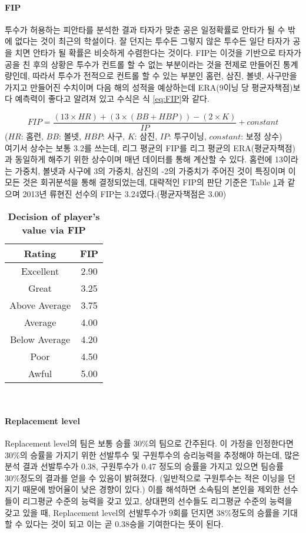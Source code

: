 \documentclass[11pt]{article}
\begin{document}
\paragraph{FIP}
투수가 허용하는 피안타를 분석한 결과 타자가 맞춘 공은 일정확률로 안타가 될 수 밖에 없다는 것이 최근의 학설이다. 잘 던지는 투수든 그렇지 않은 투수든 일단 타자가 공을 치면 안타가 될 확률은 비슷하게 수렴한다는 것이다. FIP는 이것을 기반으로 타자가 공을 친 후의 상황은 투수가 컨트롤 할 수 없는 부분이라는 것을 전제로 만들어진 통계량인데, 따라서 투수가 전적으로 컨트롤 할 수 있는 부분인 홈런, 삼진, 볼넷, 사구만을 가지고 만들어진 수치이며 다음 해의 성적을 예상하는데 ERA(9이닝 당 평균자책점)보다 예측력이 좋다고 알려져 있고 수식은 식 \ref{eq:FIP}와 같다\cite{FIP}.

\begin{equation}
\label{eq:FIP}
FIP=\frac{(13 \times HR)+(3 \times (BB+HBP))-(2 \times K)}{IP} + constant
\end{equation}
($HR$: 홈런, $BB$: 볼넷, $HBP$: 사구, $K$: 삼진, $IP$: 투구이닝, $constant$: 보정 상수)\\

여기서 상수는 보통 3.2를 쓰는데, 리그 평균의 FIP를 리그 평균의 ERA(평균자책점)과 동일하게 해주기 위한 상수이며 매년 데이터를 통해 계산할 수 있다. 홈런에 13이라는 가중치, 볼넷과 사구에 3의 가중치, 삼진의 -2의 가중치가 주어진 것이 특징이며 이 모든 것은 회귀분석을 통해 결정되었는데, 대략적인 FIP의 판단 기준은 Table \ref{FIPtable}과 같으며 2013년 류현진 선수의 FIP는 3.24였다.(평균자책점은 3.00)

\begin{table}
\centering
\begin{tabular}{|c|c|}
\hline
Rating & FIP \\ \hline
Excellent	&2.90\\
Great	&3.25\\
Above Average	&3.75\\
Average&	4.00\\
Below Average&	4.20\\
Poor&	4.50\\
Awful&	5.00 \\ \hline
\end{tabular}\\
\caption{\bf{Decision of player's value via FIP}}
\label{FIPtable}
\end{table}

\paragraph{Replacement level}
Replacement level의 팀은 보통 승률 30\%의 팀으로 간주된다. 이 가정을 인정한다면 30\%의 승률을 가지기 위한 선발투수 및 구원투수의 승리능력을 추정해야 하는데, 많은 분석 결과 선발투수가 0.38, 구원투수가 0.47 정도의 승률을 가지고 있으면 팀승률 30\%정도의 결과를 얻을 수 있음이 밝혀졌다\cite{replace_pitch}. (일반적으로 구원투수는 적은 이닝을 던지기 때문에 방어율이 낮은 경향이 있다.) 이를 해석하면 소속팀의 본인을 제외한 선수들이 리그평균 수준의 능력을 갖고 있고, 상대편의 선수들도 리그평균 수준의 능력을 갖고 있을 때, Replacement level의 선발투수가 9회를 던지면 38\%정도의 승률을 기대할 수 있다는 것이 되고 이는 곧 0.38승을 기여한다는 뜻이 된다. 
\end{document}

